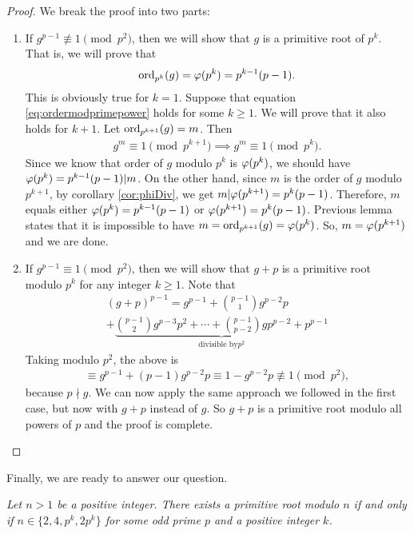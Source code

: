 \documentclass{subfile}
\begin{document}
	\begin{proof}
		We break the proof into two parts:
		\begin{enumerate}
			\item If $g^{p-1} \not \equiv 1 \pmod{p^2}$, then we will show that $g$ is a primitive root of $p^k$. That is, we will prove that
				\begin{align}\label{eq:ordermodprimepower}
					\operatorname{ord}_{p^k} (g)=\varphi(p^k)=p^{k-1}(p-1).
				\end{align}
			This is obviously true for $k=1$. Suppose that equation \eqref{eq:ordermodprimepower} holds for some $k\geq 1$. We will prove that it also holds for $k+1$. Let $\operatorname{ord}_{p^{k+1}} (g)=m$. Then
				\begin{align*}
					g^m \equiv 1 \pmod{p^{k+1}} \implies g^m \equiv 1 \pmod{p^{k}}.
				\end{align*}
			Since we know that order of $g$ modulo $p^k$ is $\varphi(p^k)$, we should have $\varphi(p^k)=p^{k-1}(p-1)|m$. On the other hand, since $m$ is the order of $g$ modulo $p^{k+1}$, by corollary \eqref{cor:phiDiv}, we get $m|\varphi(p^{k+1})=p^k(p-1)$. Therefore, $m$ equals either $\varphi(p^k)=p^{k-1}(p-1)$ or $\varphi(p^{k+1})=p^{k}(p-1)$. Previous lemma states that it is impossible to have $m=\operatorname{ord}_{p^{k+1}} (g)=\varphi(p^k)$. So, $m=\varphi(p^{k+1})$ and we are done.
			
			\item If $g^{p-1} \equiv 1 \pmod{p^2}$, then we will show that $g+p$ is a primitive root modulo $p^k$ for any integer $k\geq 1$. Note that
				\begin{multline*}
					(g+p)^{p-1} = g^{p-1} + \binom{p-1}{1} g^{p-2}p \\ + \underbrace{\binom{p-1}{2}g^{p-3}p^2+\cdots + \binom{p-1}{p-2} gp^{p-2} + p^{p-1}}_{\text{divisible by} p^2}
				\end{multline*}
			Taking modulo $p^2$, the above is
				\begin{align*}
					\equiv g^{p-1}+(p-1)g^{p-2}p \equiv 1 - g^{p-2}p \not \equiv 1 \pmod{p^2},
				\end{align*}
			because $p \nmid g$. We can now apply the same approach we followed in the first case, but now with $g+p$ instead of $g$. So $g+p$ is a primitive root modulo all powers of $p$ and the proof is complete.
		\end{enumerate}
	\end{proof}

Finally, we are ready to answer our question.

	\begin{theorem}\slshape
		Let $n>1$ be a positive integer. There exists a primitive root modulo $n$ if and only if $n\in\{2,4,p^k,2p^k\}$ for some odd prime $p$ and a positive integer $k$.
		\label{thm:pr:wh} 
	\end{theorem}
	
\end{document}
